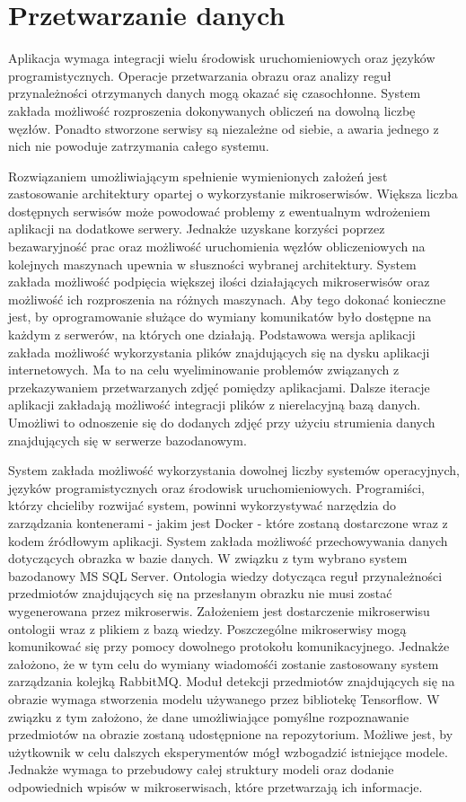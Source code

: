 \section{Przetwarzanie danych}{
Aplikacja wymaga integracji wielu środowisk uruchomieniowych oraz języków programistycznych. Operacje przetwarzania obrazu oraz analizy reguł przynależności otrzymanych danych mogą okazać się czasochłonne. System zakłada możliwość rozproszenia dokonywanych obliczeń na dowolną liczbę węzłów. Ponadto stworzone serwisy są niezależne od siebie, a awaria jednego z nich nie powoduje zatrzymania całego systemu. 

Rozwiązaniem umożliwiającym spełnienie wymienionych założeń jest zastosowanie architektury opartej o wykorzystanie mikroserwisów. Większa liczba dostępnych serwisów może powodować problemy z ewentualnym wdrożeniem aplikacji na dodatkowe serwery. Jednakże uzyskane korzyści poprzez bezawaryjność prac oraz możliwość uruchomienia węzłów obliczeniowych na kolejnych maszynach upewnia w słuszności wybranej architektury. System zakłada możliwość podpięcia większej ilości działających mikroserwisów oraz możliwość ich rozproszenia na różnych maszynach. Aby tego dokonać konieczne jest, by oprogramowanie służące do wymiany komunikatów było dostępne na każdym z serwerów, na których one działają. Podstawowa wersja aplikacji zakłada możliwość wykorzystania plików znajdujących się na dysku aplikacji internetowych. Ma to na celu wyeliminowanie problemów związanych z przekazywaniem przetwarzanych zdjęć pomiędzy aplikacjami. Dalsze iteracje aplikacji zakładają możliwość integracji plików z nierelacyjną bazą danych. Umożliwi to odnoszenie się do dodanych zdjęć przy użyciu strumienia danych znajdujących się w serwerze bazodanowym.

System zakłada możliwość wykorzystania dowolnej liczby systemów operacyjnych, języków programistycznych oraz środowisk uruchomieniowych. Programiści, którzy chcieliby rozwijać system, powinni wykorzystywać narzędzia do zarządzania kontenerami - jakim jest Docker \cite{Docker}- które zostaną dostarczone wraz z kodem źródłowym aplikacji. System zakłada możliwość przechowywania danych dotyczących obrazka w bazie danych. W związku z tym wybrano system bazodanowy MS SQL Server. Ontologia wiedzy dotycząca reguł przynależności przedmiotów znajdujących się na przesłanym obrazku nie musi zostać wygenerowana przez mikroserwis. Założeniem jest dostarczenie mikroserwisu ontologii wraz z plikiem z bazą wiedzy. Poszczególne mikroserwisy mogą komunikować się przy pomocy dowolnego protokołu komunikacyjnego. Jednakże założono, że w tym celu do wymiany wiadomośći zostanie zastosowany system zarządzania kolejką RabbitMQ. Moduł detekcji przedmiotów znajdujących się na obrazie wymaga stworzenia modelu używanego przez bibliotekę Tensorflow. W związku z tym założono, że dane umożliwiające pomyślne rozpoznawanie przedmiotów na obrazie zostaną udostępnione na repozytorium. Możliwe jest, by użytkownik w celu dalszych eksperymentów mógł wzbogadzić istniejące modele. Jednakże wymaga to przebudowy całej struktury modeli oraz dodanie odpowiednich wpisów w mikroserwisach, które przetwarzają ich informacje.
}

